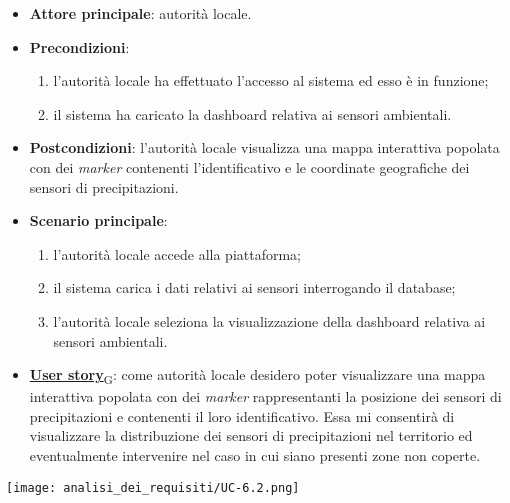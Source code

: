 \begin{itemize}
	\item \textbf{Attore principale}: autorità locale.
	\item \textbf{Precondizioni}:
	      \begin{enumerate}
		      \item l'autorità locale ha effettuato l'accesso al sistema ed esso è in funzione;
		      \item il sistema ha caricato la dashboard relativa ai sensori ambientali.
	      \end{enumerate}
	\item \textbf{Postcondizioni}: l'autorità locale visualizza una mappa interattiva popolata con dei \textit{marker} contenenti l'identificativo e le coordinate geografiche dei sensori di precipitazioni.
	\item \textbf{Scenario principale}:
	      \begin{enumerate}
		      \item l'autorità locale accede alla piattaforma;
		      \item il sistema carica i dati relativi ai sensori interrogando il database;
		      \item l'autorità locale seleziona la visualizzazione della dashboard relativa ai sensori ambientali.
	      \end{enumerate}
	\item \href{https://7last.github.io/docs/pb/documentazione-interna/glossario\#user-story}{\textbf{User story}\textsubscript{G}}:
	      come autorità locale desidero poter visualizzare una mappa interattiva popolata con dei \textit{marker} rappresentanti la posizione dei sensori di precipitazioni
	      e contenenti il loro identificativo. Essa mi consentirà di visualizzare la distribuzione dei sensori di precipitazioni nel territorio ed
	      eventualmente intervenire nel caso in cui siano presenti zone non coperte.
\end{itemize}
\begin{center}
	\texttt{[image: analisi\_dei\_requisiti/UC-6.2.png]}
\end{center}


